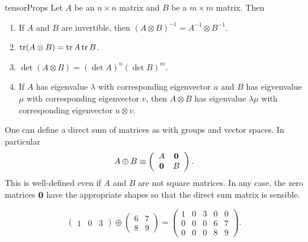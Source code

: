 \begin{proposition}{}{tensorProps}
Let $A$ be an $n\times n$ matrix and $B$ be a $m\times m$ matrix. Then
\begin{enumerate}
\item If $A$ and $B$ are invertible, then
$(A\otimes B)^{-1}=A^{-1}\otimes B^{-1}$.
\item $\tr(A\otimes B)=\tr A\tr B$.
\item $\det(A\otimes B)=(\det A)^n(\det B)^m$.
\item If $A$ has eigenvalue $\lambda$ with corresponding eigenvector
$u$ and $B$ has eigvenvalue $\mu$ with corresponding eigenvector $v$,
then $A\otimes B$ has eigenvalue $\lambda\mu$ with corresponding
eigenvector $u\otimes v$.
\end{enumerate}
\end{proposition}

One can define a direct sum of matrices as with
groups and vector spaces. In particular
\begin{equation}
A\oplus B\equiv
 \left(\begin{array}{cc}
 A & {\mathbf 0}  \\
 {\mathbf 0} & B 
 \end{array}\right).
\end{equation}
This is well-defined even if $A$ and $B$ are not square matrices.
In any case, the zero matrices ${\mathbf 0}$ have the appropriate shapes
so that the direct sum matrix is sensible.

\begin{example}{}{}
$$
\left(\begin{array}{ccc}
1 & 0 & 3
\end{array}\right) \oplus\left(\begin{array}{cc}
6 & 7 \\
8 & 9
\end{array}\right)=\left(\begin{array}{ccccc}
1 & 0 & 3 & 0 & 0 \\
0 & 0 & 0 & 6 & 7 \\
0 & 0 & 0 & 8 & 9
\end{array}\right).
$$
\end{example}

